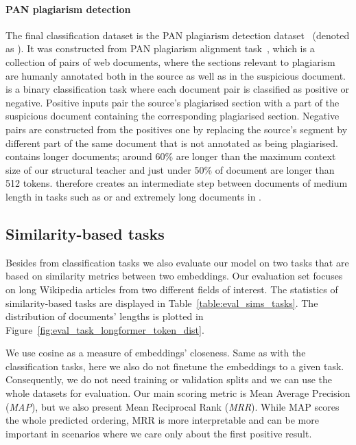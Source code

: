 \paragraph{PAN plagiarism detection} The final classification dataset is the
PAN plagiarism detection dataset~\citep{zhou2020multilevel} (denoted as
). It was constructed from PAN plagiarism alignment
task~\citep{potthast2013overview}, which is a collection of pairs of web
documents, where the sections relevant to plagiarism are humanly annotated both
in the source as well as in the suspicious document.  is a binary
classification task where each document pair is classified as positive or
negative. Positive inputs pair the source's plagiarised section with a part of
the suspicious document containing the corresponding plagiarised section.
Negative pairs are constructed from the positives one by replacing the source's
segment by different part of the same document that is not annotated as being
plagiarised.  contains longer documents; around 60\% are longer than
the maximum context size of our structural teacher and just under 50\% of
document are longer than 512 tokens.  therefore creates an
intermediate step between documents of medium length in tasks such as
 or  and extremely long documents in .


\subsection{Similarity-based tasks}

Besides from classification tasks we also evaluate our model on two tasks that
are based on similarity metrics between two embeddings. Our evaluation set
focuses on long Wikipedia articles from two different fields of interest. The
statistics of similarity-based tasks are displayed in
Table~\ref{table:eval_sims_tasks}. The distribution of documents' lengths is
plotted in Figure~\ref{fig:eval_task_longformer_token_dist}.

We use cosine as a measure of embeddings' closeness. Same as with the
classification tasks, here we also do not finetune the embeddings to a given
task. Consequently, we do not need training or validation splits and we can use
the whole datasets for evaluation. Our main scoring metric is Mean Average
Precision (\emph{MAP}), but we also present Mean Reciprocal Rank (\emph{MRR}).
While MAP scores the whole predicted ordering, MRR is more interpretable and can
be more important in scenarios where we care only about the first positive
result.

